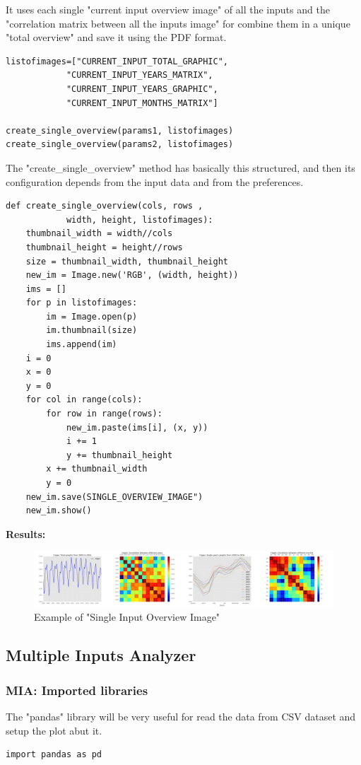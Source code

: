 It uses each single "current input overview image" of all the inputs and the "correlation matrix between all the inputs image" for combine them in a unique "total overview" and save it using the PDF format.

\begin{lstlisting}
listofimages=["CURRENT_INPUT_TOTAL_GRAPHIC",
            "CURRENT_INPUT_YEARS_MATRIX", 
            "CURRENT_INPUT_YEARS_GRAPHIC",
            "CURRENT_INPUT_MONTHS_MATRIX"]
           
create_single_overview(params1, listofimages)
create_single_overview(params2, listofimages)
\end{lstlisting}


The "create\_single\_overview" method has basically this structured, and then its configuration depends from the input data and from the preferences.
\begin{lstlisting}
def create_single_overview(cols, rows ,
			width, height, listofimages):
    thumbnail_width = width//cols
    thumbnail_height = height//rows
    size = thumbnail_width, thumbnail_height
    new_im = Image.new('RGB', (width, height))
    ims = []
    for p in listofimages:
        im = Image.open(p)
        im.thumbnail(size)
        ims.append(im)
    i = 0
    x = 0
    y = 0
    for col in range(cols):
        for row in range(rows):
            new_im.paste(ims[i], (x, y))
            i += 1
            y += thumbnail_height
        x += thumbnail_width
        y = 0
    new_im.save(SINGLE_OVERVIEW_IMAGE")
	new_im.show()
\end{lstlisting}

\textbf{Results:}
\begin{figure}[H]
	\centering
    \includegraphics[width=1\textwidth]{Files/Cages_Overview.jpg}
    \caption{Example of "Single Input Overview Image"}
\end{figure}




\newpage
\subsection{Multiple Inputs Analyzer}
\subsubsection{MIA: Imported libraries}
The "pandas" library will be very useful for read the data from CSV dataset and setup the plot abut it.
\begin{lstlisting}
import pandas as pd
\end{lstlisting}

